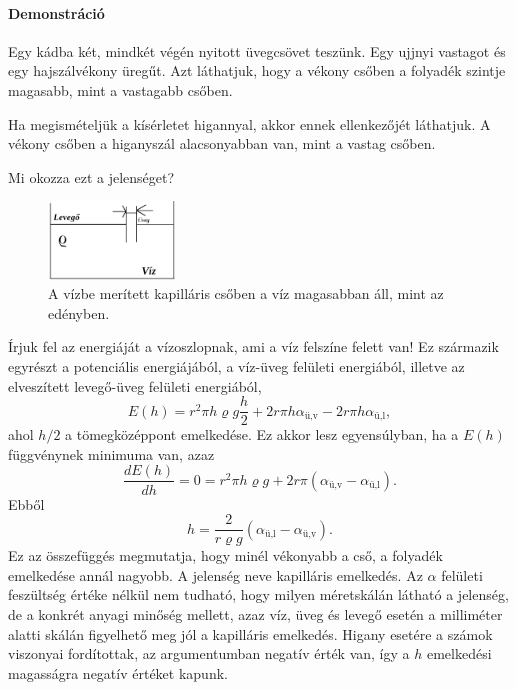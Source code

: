 \documentclass[12pt,a4paper]{scrartcl}
\begin{document}
\footnotesize
\paragraph{Demonstráció}
Egy kádba két, mindkét végén nyitott üvegcsövet teszünk. Egy ujjnyi vastagot és egy hajszálvékony üregűt. Azt láthatjuk, hogy a vékony csőben a folyadék szintje magasabb, mint a vastagabb csőben.

Ha megismételjük a kísérletet higannyal, akkor ennek ellenkezőjét láthatjuk. A vékony csőben a higanyszál alacsonyabban van, mint a vastag csőben.

Mi okozza ezt a jelenséget?
\normalsize

\begin{figure}[htbp]
	\begin{center}
		\includegraphics[width=0.3\textwidth]{tetel74.png}
		\caption{A vízbe merített kapilláris csőben a víz magasabban áll, mint az edényben.}
	\end{center}
\end{figure}

Írjuk fel az energiáját a vízoszlopnak, ami a víz felszíne felett van! Ez származik egyrészt a potenciális energiájából, a víz-üveg felületi energiából, illetve az elveszített levegő-üveg felületi energiából,
\[E\left( h \right) = {r^2}\pi h\varrho g\frac{h}{2} + 2r\pi h{\alpha _{{\text{ü,v}}}} - 2r\pi h{\alpha _{{\text{ü,l}}}},\]
ahol $h/2$ a tömegközéppont emelkedése. Ez akkor lesz egyensúlyban, ha a $E\left( h \right)$ függvénynek minimuma van, azaz
\[\frac{{dE\left( h \right)}}{{dh}} = 0 = {r^2}\pi h\varrho g + 2r\pi \left( {{\alpha _{{\text{ü,v}}}} - {\alpha _{{\text{ü,l}}}}} \right).\] 
Ebből
\begin{equation} \label{eq:kapillaris_emelkedes}
h = \frac{{2}}{{r \varrho g}}\left( {{\alpha _{{\text{ü,l}}}} - {\alpha _{{\text{ü,v}}}}} \right).
\end{equation}
Ez az összefüggés megmutatja, hogy minél vékonyabb a cső, a folyadék emelkedése annál nagyobb. A jelenség neve kapilláris emelkedés. Az $\alpha$ felületi feszültség értéke nélkül nem tudható, hogy milyen méretskálán látható a jelenség, de a konkrét anyagi minőség mellett, azaz víz, üveg és levegő esetén a milliméter alatti skálán figyelhető meg jól a kapilláris emelkedés. Higany esetére a számok viszonyai fordítottak, az argumentumban negatív érték van, így a $h$ emelkedési magasságra negatív értéket kapunk.
\footnotesize
\end{document}
